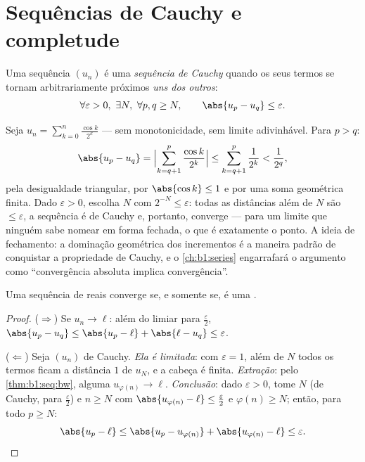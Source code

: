\section{Sequências de Cauchy e completude}

\begin{definition}\label{def:b1:seq:cauchy}
Uma sequência $(u_n)$ é uma \emph{sequência de
Cauchy} quando os seus termos se tornam
arbitrariamente próximos \emph{uns dos outros}:
\[
\forall \varepsilon > 0,\ \exists N,\ \forall p, q \geq N,
\qquad \abs{u_p - u_q} \leq \varepsilon .
\]
\end{definition}

\begin{example}\label{ex:b1:seq:cauchyhand}
Seja $u_n = \sum_{k=0}^{n} \frac{\cos k}{2^k}$ --- sem monotonicidade,
sem limite adivinhável. Para $p > q$:
\[
\abs{u_p - u_q}
= \Bigl| \sum_{k=q+1}^{p} \frac{\cos k}{2^k} \Bigr|
\leq \sum_{k=q+1}^{p} \frac{1}{2^k}
< \frac{1}{2^{q}} ,
\]
pela desigualdade triangular, por $\abs{\cos k} \leq 1$ e por uma soma
geométrica finita. Dado $\varepsilon > 0$, escolha $N$ com $2^{-N}
\leq \varepsilon$: todas as distâncias além de $N$ são $\leq \varepsilon$,
a sequência é de Cauchy e, portanto, converge --- para um limite que
ninguém sabe nomear em forma fechada, o que é exatamente o ponto. A
ideia de fechamento: a dominação geométrica dos incrementos é a maneira
padrão de conquistar a propriedade de Cauchy, e o \cref{ch:b1:series}
engarrafará o argumento como ``convergência absoluta implica
convergência''.
\end{example}

\begin{theorem}[Completude de $\R$]\label{thm:b1:seq:complete}
Uma sequência de reais converge se, e somente se, é uma .
\end{theorem}

\begin{proof}
($\Rightarrow$) Se $u_n \to \ell$: além do limiar para
$\frac\varepsilon2$, $\abs{u_p - u_q} \leq \abs{u_p - \ell} +
\abs{\ell - u_q} \leq \varepsilon$.

($\Leftarrow$) Seja $(u_n)$ de Cauchy. \emph{Ela é limitada}: com
$\varepsilon = 1$, além de $N$ todos os termos ficam a distância $1$ de $u_N$,
e a cabeça é finita. \emph{Extração}: pelo
\cref{thm:b1:seq:bw}, alguma  $u_{\varphi(n)} \to \ell$.
\emph{Conclusão}: dado $\varepsilon > 0$, tome $N$ (de Cauchy, para
$\frac\varepsilon2$) e $n \geq N$ com $\abs{u_{\varphi(n)} - \ell}
\leq \frac\varepsilon2$ e $\varphi(n) \geq N$; então, para todo $p
\geq N$:
\[
\abs{u_p - \ell} \leq \abs{u_p - u_{\varphi(n)}} +
\abs{u_{\varphi(n)} - \ell} \leq \varepsilon . \qedhere
\]
\end{proof}


